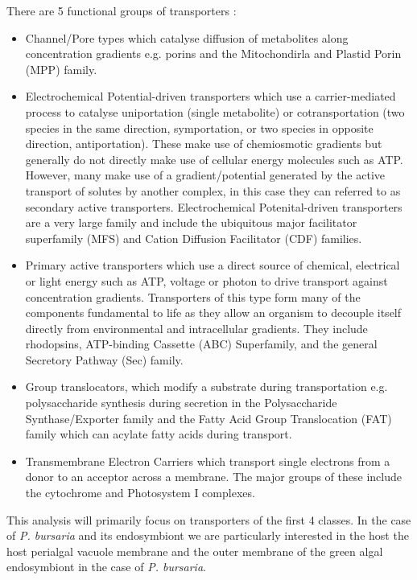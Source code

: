 There are 5 functional groups of transporters \citep{Saier2014}:
\begin{itemize}
    \item Channel/Pore types which catalyse diffusion of metabolites along concentration
        gradients e.g. porins and the Mitochondirla and Plastid Porin (MPP) family.
    \item Electrochemical Potential-driven transporters which use a carrier-mediated process to catalyse
        uniportation (single metabolite) or cotransportation (two species in the same
        direction, symportation, or two species in opposite direction, antiportation).  These make use
        of chemiosmotic gradients but generally do not directly make use of cellular energy molecules
        such as ATP. However, many make use of a gradient/potential generated by the active transport
        of solutes by another complex, in this case they can referred to as secondary active transporters.
        Electrochemical Potenital-driven transporters are a very large family and include 
        the ubiquitous major facilitator superfamily (MFS) and Cation Diffusion Facilitator (CDF) families. 
    \item Primary active transporters which use a direct source of chemical, electrical or light energy 
        such as ATP, voltage or photon to drive transport against concentration gradients.  Transporters
         of this type form many of the components fundamental to life as they allow an organism to 
         decouple itself directly from environmental and intracellular gradients. 
         They include rhodopsins, ATP-binding Cassette (ABC) Superfamily, and the general Secretory Pathway (Sec)
        family.
    \item Group translocators, which modify a substrate during transportation e.g. polysaccharide synthesis
        during secretion in the Polysaccharide Synthase/Exporter family and the Fatty Acid Group Translocation (FAT)
        family which can acylate fatty acids during transport.
    \item Transmembrane Electron Carriers which transport single electrons from a donor to an acceptor across
        a membrane. The major groups of these include the cytochrome and Photosystem I complexes. 
\end{itemize}

This analysis will primarily focus on transporters of the first 4 classes.
In the case of \textit{P. bursaria} and its endosymbiont we are
particularly interested in the host 
the host perialgal vacuole membrane and the outer membrane of the green
algal endosymbiont in the case of \textit{P. bursaria}.  

